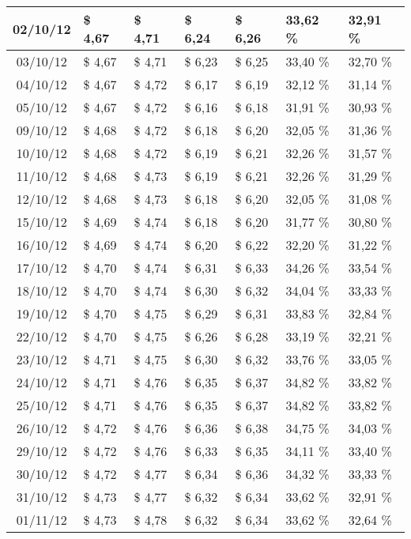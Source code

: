 \begin{center}
\begin{longtable}{|c|p{1.5cm}|p{1.5cm}|p{1.5cm}|p{1.5cm}|p{1.5cm}|p{1.5cm}|}
02/10/12 & \$ 4,67 & \$ 4,71 & \$ 6,24 & \$ 6,26 & 33,62 \% & 32,91 \% \\ \hline
03/10/12 & \$ 4,67 & \$ 4,71 & \$ 6,23 & \$ 6,25 & 33,40 \% & 32,70 \% \\ \hline
04/10/12 & \$ 4,67 & \$ 4,72 & \$ 6,17 & \$ 6,19 & 32,12 \% & 31,14 \% \\ \hline
05/10/12 & \$ 4,67 & \$ 4,72 & \$ 6,16 & \$ 6,18 & 31,91 \% & 30,93 \% \\ \hline
09/10/12 & \$ 4,68 & \$ 4,72 & \$ 6,18 & \$ 6,20 & 32,05 \% & 31,36 \% \\ \hline
10/10/12 & \$ 4,68 & \$ 4,72 & \$ 6,19 & \$ 6,21 & 32,26 \% & 31,57 \% \\ \hline
11/10/12 & \$ 4,68 & \$ 4,73 & \$ 6,19 & \$ 6,21 & 32,26 \% & 31,29 \% \\ \hline
12/10/12 & \$ 4,68 & \$ 4,73 & \$ 6,18 & \$ 6,20 & 32,05 \% & 31,08 \% \\ \hline
15/10/12 & \$ 4,69 & \$ 4,74 & \$ 6,18 & \$ 6,20 & 31,77 \% & 30,80 \% \\ \hline
16/10/12 & \$ 4,69 & \$ 4,74 & \$ 6,20 & \$ 6,22 & 32,20 \% & 31,22 \% \\ \hline
17/10/12 & \$ 4,70 & \$ 4,74 & \$ 6,31 & \$ 6,33 & 34,26 \% & 33,54 \% \\ \hline
18/10/12 & \$ 4,70 & \$ 4,74 & \$ 6,30 & \$ 6,32 & 34,04 \% & 33,33 \% \\ \hline
19/10/12 & \$ 4,70 & \$ 4,75 & \$ 6,29 & \$ 6,31 & 33,83 \% & 32,84 \% \\ \hline
22/10/12 & \$ 4,70 & \$ 4,75 & \$ 6,26 & \$ 6,28 & 33,19 \% & 32,21 \% \\ \hline
23/10/12 & \$ 4,71 & \$ 4,75 & \$ 6,30 & \$ 6,32 & 33,76 \% & 33,05 \% \\ \hline
24/10/12 & \$ 4,71 & \$ 4,76 & \$ 6,35 & \$ 6,37 & 34,82 \% & 33,82 \% \\ \hline
25/10/12 & \$ 4,71 & \$ 4,76 & \$ 6,35 & \$ 6,37 & 34,82 \% & 33,82 \% \\ \hline
26/10/12 & \$ 4,72 & \$ 4,76 & \$ 6,36 & \$ 6,38 & 34,75 \% & 34,03 \% \\ \hline
29/10/12 & \$ 4,72 & \$ 4,76 & \$ 6,33 & \$ 6,35 & 34,11 \% & 33,40 \% \\ \hline
30/10/12 & \$ 4,72 & \$ 4,77 & \$ 6,34 & \$ 6,36 & 34,32 \% & 33,33 \% \\ \hline
31/10/12 & \$ 4,73 & \$ 4,77 & \$ 6,32 & \$ 6,34 & 33,62 \% & 32,91 \% \\ \hline
01/11/12 & \$ 4,73 & \$ 4,78 & \$ 6,32 & \$ 6,34 & 33,62 \% & 32,64 \% \\ \hline

\end{longtable}
\end{center}
